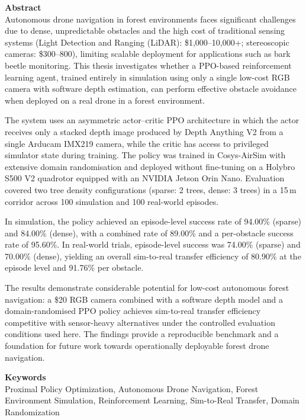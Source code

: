 \documentclass[../main.tex]{subfiles}
\begin{document}
\raggedright\textbf{Abstract}\\
\justifying\noindent
Autonomous drone navigation in forest environments faces significant challenges due to dense, unpredictable obstacles and the high cost of traditional sensing systems (Light Detection and Ranging (LiDAR): \$1,000--10,000+; stereoscopic cameras: \$300--800), limiting scalable deployment for applications such as bark beetle monitoring. This thesis investigates whether a PPO-based reinforcement learning agent, trained entirely in simulation using only a single low-cost RGB camera with software depth estimation, can perform effective obstacle avoidance when deployed on a real drone in a forest environment.

\justifying\noindent
The system uses an asymmetric actor--critic PPO architecture in which the actor receives only a stacked depth image produced by Depth Anything V2 from a single Arducam IMX219 camera, while the critic has access to privileged simulator state during training. The policy was trained in Cosys-AirSim with extensive domain randomisation and deployed without fine-tuning on a Holybro S500 V2 quadrotor equipped with an NVIDIA Jetson Orin Nano. Evaluation covered two tree density configurations (sparse: 2 trees, dense: 3 trees) in a 15\,m corridor across 100 simulation and 100 real-world episodes.

\justifying\noindent
In simulation, the policy achieved an episode-level success rate of 94.00\% (sparse) and 84.00\% (dense), with a combined rate of 89.00\% and a per-obstacle success rate of 95.60\%. In real-world trials, episode-level success was 74.00\% (sparse) and 70.00\% (dense), yielding an overall sim-to-real transfer efficiency of 80.90\% at the episode level and 91.76\% per obstacle.

\justifying\noindent
The results demonstrate considerable potential for low-cost autonomous forest navigation: a \$20 RGB camera combined with a software depth model and a domain-randomised PPO policy achieves sim-to-real transfer efficiency competitive with sensor-heavy alternatives under the controlled evaluation conditions used here. The findings provide a reproducible benchmark and a foundation for future work towards operationally deployable forest drone navigation.\vspace{5mm}

\raggedright\textbf{Keywords}\\
\noindent
Proximal Policy Optimization, Autonomous Drone Navigation, Forest Environment Simulation, Reinforcement Learning, Sim-to-Real Transfer, Domain Randomization\vspace{5mm}
\end{document}

